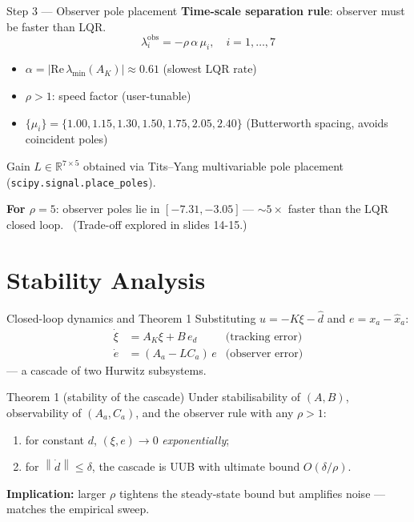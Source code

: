 \documentclass[10pt,aspectratio=169]{beamer}
\newcommand{\R}{\mathbb{R}}
\newcommand{\norm}[1]{\left\lVert#1\right\rVert}
\begin{document}
\begin{frame}{Step 3 — Observer pole placement}
  \textbf{Time-scale separation rule}: observer must be faster than LQR.
  \begin{equation*}
    \lambda_i^{\mathrm{obs}}=-\rho\,\alpha\,\mu_i,
    \quad i=1,\ldots,7
  \end{equation*}
  \begin{itemize}
    \item $\alpha=|\mathrm{Re}\,\lambda_{\min}(A_K)|\approx 0.61$
          (slowest LQR rate)
    \item $\rho>1$: \alert{speed factor} (user-tunable)
    \item $\{\mu_i\}=\{1.00,1.15,1.30,1.50,1.75,2.05,2.40\}$
          (Butterworth spacing, avoids coincident poles)
  \end{itemize}

  \vspace{0.4em}
  Gain $L\in\R^{7\times 5}$ obtained via Tits--Yang multivariable pole
  placement~\cite{kautsky1985} (\texttt{scipy.signal.place\_poles}).

  \vspace{0.5em}
  \textbf{For $\rho=5$}: observer poles lie in $[-7.31,-3.05]$\,---
  \alert{$\sim 5\times$ faster} than the LQR closed loop. \
  (Trade-off explored in slides 14-15.)
\end{frame}

\section{Stability Analysis}

\begin{frame}{Closed-loop dynamics and Theorem 1}
  Substituting $u=-K\xi-\hat d$ and $e=x_a-\hat x_a$:
  \begin{equation*}
    \begin{aligned}
      \dot\xi &= A_K\xi + B\,e_d  & \text{(tracking error)}\\
      \dot e   &= (A_a-LC_a)\,e    & \text{(observer error)}
    \end{aligned}
  \end{equation*}
  — a \alert{cascade} of two Hurwitz subsystems.

  \begin{block}{Theorem 1 (stability of the cascade)}
    Under stabilisability of $(A,B)$, observability of $(A_a,C_a)$, and the
    observer rule with any $\rho>1$:
    \begin{enumerate}
      \item[(i)] for constant $d$, $(\xi,e)\to 0$ \emph{exponentially};
      \item[(ii)] for $\norm{\dot d}\le\delta$, the cascade is UUB with
                  ultimate bound $O(\delta/\rho)$.
    \end{enumerate}
  \end{block}

  \textbf{Implication:} larger $\rho$ tightens the steady-state bound but
  amplifies noise — matches the empirical sweep.
\end{frame}
\end{document}
